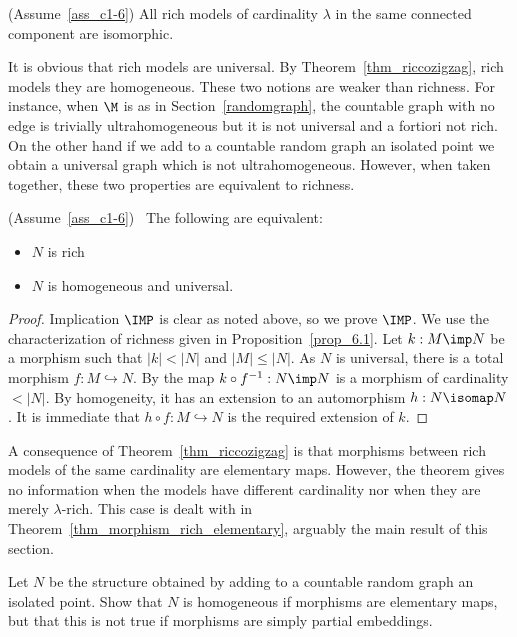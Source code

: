 \begin{corollary}\label{coroll_riccozigzag}
(Assume~\ref{ass_c1-6})  All rich models of cardinality $\lambda$ in the same connected component are isomorphic.
\end{corollary}

It is obvious that rich models are universal.
By Theorem~\ref{thm_riccozigzag}, rich models they are ho\-mo\-ge\-ne\-ous.
These two notions are weaker than richness.
For instance, when $\M$ is as in Section~\ref{randomgraph}, the countable graph with no edge is trivially ultrahomogeneous but it is not universal and a fortiori not rich.
On the other hand if we add to a countable random graph an isolated point we obtain a universal graph which is not ultrahomogeneous.
However, when taken together, these two properties are equivalent to richness.

\begin{theorem}\label{ricco<->universaleomogeneo}
(Assume~\ref{ass_c1-6}) \ The following are equivalent:
\begin{itemize}
\item[1.] $N$ is rich
\item[2.] $N$ is homogeneous and universal.
\end{itemize}
\end{theorem}
\begin{proof} 
Implication $\IMP$ is clear as noted above, so we prove $\IMP$.
We use the characterization of richness given in Proposition~\ref{prop_6.1}.
Let $k:M\imp N$ be a morphism such that $|k|<|N|$ and $|M|\le|N|$.
As $N$ is universal, there is a total morphism \hbox{$f:M\hookrightarrow N$}.
By  the map $k\circ f^{-1}:N\imp N$ is a morphism of cardinality $<|N|$.
By homogeneity, it has an extension to an automorphism $h:N\isomap N$.
It is immediate that $h\circ f:M\hookrightarrow N$ is the required extension of $k$.
\end{proof}

A consequence of Theorem~\ref{thm_riccozigzag} is that morphisms between rich models of the same cardinality are elementary maps.
However, the theorem gives no information when the models have different cardinality nor when they are merely $\lambda$-rich.
This case is dealt with in Theorem~\ref{thm_morphism_rich_elementary}, arguably the main result of this section.

\begin{exercise}
Let $N$ be the structure obtained by adding to a countable random graph an isolated point.
Show that $N$ is homogeneous if morphisms are elementary maps, but that this is not true if morphisms are simply partial embeddings.
\end{exercise}

